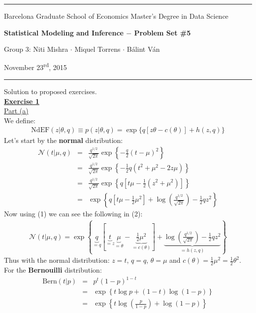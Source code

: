 \documentclass[a4paper, 11pt]{article}
\newcommand{\header}[4]{
	\begin{center}
		\rule{\linewidth}{0.5pt}
		
		{\small{#1}}
      
        \vspace{0.2in}
        
		{\large{#2}}
		
        \vspace{0.2in}
        
		{\small{#3}}
		
		\vspace{0.15in}
		
		{#4}
		
		\vspace{-0.1in}
		\rule{\linewidth}{0.6pt}
	\end{center}
}
\begin{document}
 
\header{\sc Barcelona Graduate School of Economics \hfill Master's Degree in Data Science}{\bf Statistical Modeling and Inference $-$ Problem Set \#5}{\sc Group 3: Niti Mishra $\cdot$ Miquel Torrens $\cdot$ B\'alint V\'an}{November 23\textsuperscript{rd}, 2015}
Solution to proposed exercises.\\
\newline \textbf{\underline{Exercise 1}}\\
\newline \underline{Part (a)}\\
\newline We define:
\begin{eqnarray}
\text{NdEF}(z | \theta, q) \equiv p(z | \theta, q) = \exp \lbrace q [z \theta - c(\theta)] + h(z,q) \rbrace
\end{eqnarray}
Let's start by the \textbf{normal} distribution:
\begin{eqnarray}
\mathcal{N}(t | \mu, q) &=& \frac{q^{1/2}}{\sqrt{2 \pi}} \exp \left\{ -\frac{q}{2} (t - \mu)^2 \right\}  \nonumber \\
&=& \frac{q^{1/2}}{\sqrt{2 \pi}} \exp \left\{ -\frac{1}{2} q (t^2 + \mu^2 - 2z\mu) \right\}  \nonumber \\
&=& \frac{q^{1/2}}{\sqrt{2 \pi}} \exp \left\{ q \left[t \mu -\frac{1}{2} \left( z^2 + \mu^2 \right) \right] \right\}  \nonumber \\
&=& \exp \left\{ q \left[ t \mu - \frac{1}{2} \mu^2 \right] + \log \left(  \frac{q^{1/2}}{\sqrt{2 \pi}} \right) - \frac{1}{2} q z^2  \right\}
\end{eqnarray}
Now using (1) we can see the following in (2):
\begin{eqnarray}
\mathcal{N}(t | \mu, q) = \exp \left\{ \underbrace{q}_{= q} \left[ \underbrace{t}_{=z} \underbrace{\mu}_{=\theta} - \underbrace{\frac{1}{2} \mu^2}_{=c(\theta)} \right]   + \underbrace{\log \left( \frac{q^{1/2}}{\sqrt{2 \pi}} \right) - \frac{1}{2} q z^2}_{=h(z,q)}  \right\}
\end{eqnarray}
Thus with the normal distribution: $z=t$, $q = q$, $\theta = \mu$ and $c(\theta) = \frac{1}{2} \mu^2 =  \frac{1}{2} \theta^2$.\\
\newline For the \textbf{Bernouilli} distribution:
\begin{eqnarray}
\text{Bern}(t | p) &=& p^t (1-p)^{1-t}  \nonumber \\
&=& \exp \left\{ t \log{p} + (1-t) \log{(1-p)} \right\} \nonumber \\
&=& \exp \left\{ t \log \left( \frac{p}{1-p} \right) + \log{(1-p)} \right\} \nonumber
\end{eqnarray}
\end{document}
